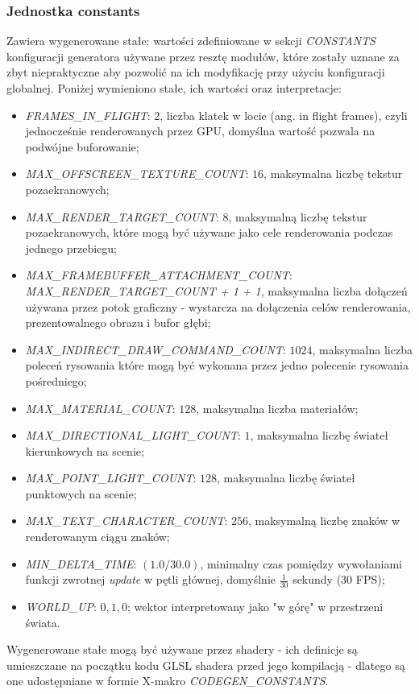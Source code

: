 \subsubsection{Jednostka constants}
Zawiera wygenerowane stałe: wartości zdefiniowane w sekcji \textit{CONSTANTS} konfiguracji generatora używane przez resztę modułów, które zostały uznane za zbyt niepraktyczne aby pozwolić na ich modyfikację przy użyciu konfiguracji globalnej.
Poniżej wymieniono stałe, ich wartości oraz interpretacje:
\begin{itemize}
	\item \textit{FRAMES\_IN\_FLIGHT}: $2$, liczba klatek w locie (ang. in flight frames), czyli jednocześnie renderowanych przez GPU, domyślna wartość pozwala na podwójne buforowanie; 
	\item \textit{MAX\_OFFSCREEN\_TEXTURE\_COUNT}: $16$, maksymalna liczbę tekstur pozaekranowych;
	\item \textit{MAX\_RENDER\_TARGET\_COUNT}: $8$, maksymalną liczbę tekstur pozaekranowych, które mogą być używane jako cele renderowania podczas jednego przebiegu; 
	\item \textit{MAX\_FRAMEBUFFER\_ATTACHMENT\_COUNT}: \textit{MAX\_RENDER\_TARGET\_COUNT + 1 + 1}, maksymalna liczba dołączeń używana przez potok graficzny - wystarcza na dołączenia celów renderowania, prezentowalnego obrazu i bufor głębi;
	\item \textit{MAX\_INDIRECT\_DRAW\_COMMAND\_COUNT}: $1024$, maksymalna liczba poleceń rysowania które mogą być wykonana przez jedno polecenie rysowania pośredniego;
	\item \textit{MAX\_MATERIAL\_COUNT}: $128$, maksymalna liczba materiałów;
	\item \textit{MAX\_DIRECTIONAL\_LIGHT\_COUNT}: $1$, maksymalna liczbę świateł kierunkowych na scenie;
	\item \textit{MAX\_POINT\_LIGHT\_COUNT}: $128$, maksymalna liczbę świateł punktowych na scenie;
	\item \textit{MAX\_TEXT\_CHARACTER\_COUNT}: $256$, maksymalną liczbę znaków w renderowanym ciągu znaków;
	\item \textit{MIN\_DELTA\_TIME}: $(1.0 / 30.0)$, minimalny czas pomiędzy wywołaniami funkcji zwrotnej \textit{update} w pętli głównej, domyślnie $\frac{1}{30}$ sekundy (30 FPS);
	\item \textit{WORLD\_UP}: $0, 1, 0$; wektor interpretowany jako "w górę" w przestrzeni świata.
\end{itemize}

Wygenerowane stałe mogą być używane przez shadery - ich definicje są umieszczane na początku kodu GLSL shadera przed jego kompilacją - dlatego są one udostępniane w formie X-makro \textit{CODEGEN\_CONSTANTS}.

